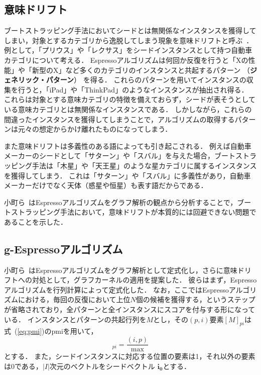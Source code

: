 \documentclass[japanese]{jnlp_1.4}
\newcommand{\pmi}{}
\begin{document}
\subsection{意味ドリフト}

ブートストラッピング手法においてシードとは無関係なインスタンスを獲得してしまい，対象とするカテゴリから逸脱してしまう現象を意味ドリフトと呼ぶ~\cite{Curran_minimisingsemantic}．
例として，「プリウス」や「レクサス」をシードインスタンスとして持つ自動車カテゴリについて考える．
Espressoアルゴリズムは何回か反復を行うと「Xの性能」や「新型のX」など多くのカテゴリのインスタンスと共起するパターン
（\textbf{ジェネリック・パターン}）
を得る．
これらのパターンを用いてインスタンスの収集を行うと，「iPad」や「ThinkPad」のようなインスタンスが抽出され得る．
これらは対象とする意味カテゴリの特徴を備えておらず，シードが表そうとしている意味カテゴリとは無関係なインスタンスである．
しかしながら，これらの間違ったインスタンスを獲得してしまうことで，アルゴリズムの取得するパターンは元々の想定からかけ離れたものになってしまう．

また意味ドリフトは多義性のある語によっても引き起こされる．
例えば自動車メーカーのシードとして「サターン」や「スバル」を与えた場合，ブートストラッピング手法は「木星」や「天王星」のような星カテゴリに属するインスタンスを獲得してしまう．
これは「サターン」や「スバル」に多義性があり，自動車メーカーだけでなく天体（惑星や恒星）も表す語だからである．

小町ら~\cite{mamoru_komachi:2010}はEspressoアルゴリズムをグラフ解析の観点から分析することで，ブートストラッピング手法において，意味ドリフトが本質的には回避できない問題であることを示した．


\subsection{g-Espressoアルゴリズム}

小町ら~\cite{mamoru_komachi:2010}はEspressoアルゴリズムをグラフ解析として定式化し，さらに意味ドリフトへの対処として，グラフカーネルの適用を提案した．
彼らはまず，Espressoアルゴリズムを行列計算によって定式化した．
なお，ここではEspressoアルゴリズムにおける，毎回の反復において上位$N$個の候補を獲得する，というステップが省略されており，全パターンと全インスタンスにスコアを付与する形になっている．
インスタンスとパターンの共起行列を$M$とし，その$(p,i)$要素$[M]_{pi}$は式~(\ref{eq:pmi})のpmiを用いて，
\begin{equation}
[M]_{pi} = \frac{\pmi (i,p)}{\max \pmi}
\end{equation}
とする．
また，シードインスタンスに対応する位置の要素は1，それ以外の要素は0である，$|I|$次元のベクトルをシードベクトル $\boldsymbol{i_{0}}$とする．
\end{document}
